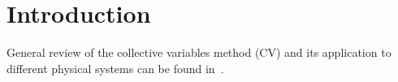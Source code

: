 \section{Introduction}

General review of the collective variables method (CV) and its application to different physical systems can be found in~\cite{Yukh2015En}.